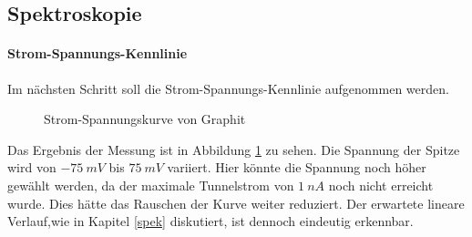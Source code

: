 \subsection{Spektroskopie}
\paragraph{Strom-Spannungs-Kennlinie}
Im nächsten Schritt soll die Strom-Spannungs-Kennlinie aufgenommen werden. 
\begin{figure}[h]
  \centering
  \caption{Strom-Spannungskurve von Graphit}
  \label{graphui}
\end{figure}
Das Ergebnis der Messung ist in Abbildung \ref{graphui} zu sehen. Die Spannung der 
Spitze wird von $\SI{-75}{mV}$ bis $\SI{75}{mV}$ variiert. Hier könnte die Spannung
noch höher gewählt werden, da der maximale Tunnelstrom von $\SI{1}{nA}$ noch nicht
erreicht wurde. Dies hätte das Rauschen der Kurve weiter reduziert.
Der erwartete lineare Verlauf,wie in Kapitel \ref{spek} diskutiert,
ist dennoch eindeutig erkennbar.

